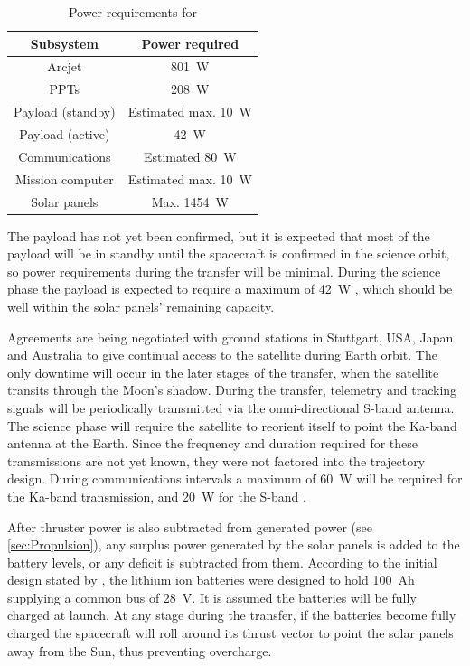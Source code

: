 \begin{table}[b]
\centering
\caption{Power requirements for \BW} \label{tab:Power}
\begin{tabular}{cc} \toprule
Subsystem & Power required \tabularnewline\midrule 
Arcjet &  801~W \tabularnewline
PPTs &  208~W \tabularnewline
Payload (standby) & Estimated max. 10~W \tabularnewline
Payload (active) & 42~W \tabularnewline
Communications & Estimated 80~W \tabularnewline
Mission computer & Estimated max. 10~W \tabularnewline\midrule
Solar panels& Max. 1454~W \tabularnewline
\bottomrule
\end{tabular}
\end{table}

The payload has not yet been confirmed, but it is expected that most of the payload will be in standby until the spacecraft is confirmed in the science orbit, so power requirements during the transfer will be minimal. During the science phase the payload is expected to require a maximum of 42~W \parencite{Laufer_thesis}, which should be well within the solar panels' remaining capacity.

Agreements are being negotiated with ground stations in Stuttgart, USA, Japan and Australia to give continual access to the satellite during Earth orbit. The only downtime will occur in the later stages of the transfer, when the satellite transits through the Moon's shadow. %
During the transfer, telemetry and tracking signals will be periodically transmitted via the omni-directional S-band antenna. The science phase will require the satellite to reorient itself to point the Ka-band antenna at the Earth. Since the frequency and duration required for these transmissions are not yet known, they were not factored into the trajectory design. During communications intervals a maximum of 60~W will be required for the Ka-band transmission, and 20~W for the S-band \parencite{Laufer_thesis}.

After thruster power is also subtracted from generated power (see \autoref{sec:Propulsion}), any surplus power generated by the solar panels is added to the battery levels, or any deficit is subtracted from them. According to the initial design stated by \textcite{Falke2004}, the lithium ion batteries were designed to hold 100~Ah supplying a common bus of 28~V. It is assumed the batteries will be fully charged at launch. At any stage during the transfer, if the batteries become fully charged the spacecraft will roll around its thrust vector to point the solar panels away from the Sun, thus preventing overcharge.

